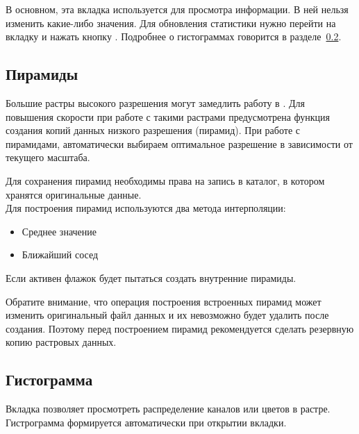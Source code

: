 В основном, эта вкладка используется для просмотра информации. В ней
нельзя изменить какие-либо значения. Для обновления статистики нужно
перейти на вкладку  и нажать кнопку .
Подробнее о гистограммах говорится в разделе~\ref{label_histogram}.

\subsection{Пирамиды}\label{raster_pyramids}

Большие растры высокого разрешения могут замедлить работу в \qg. Для повышения
скорости при работе с такими растрами предусмотрена функция создания
копий данных низкого разрешения (пирамид). При работе с пирамидами, \qg
автоматически выбираем оптимальное разрешение в зависимости от текущего масштаба.

Для сохранения пирамид необходимы права на запись в каталог, в котором
хранятся оригинальные данные. \\
Для построения пирамид используются два метода интерполяции:
\begin{itemize}[label=--]
\item Среднее значение
\item Ближайший сосед
\end{itemize}

Если активен флажок
 \qg будет
пытаться создать внутренние пирамиды.

Обратите внимание, что операция построения встроенных пирамид может
изменить оригинальный файл данных и их невозможно будет удалить после
создания. Поэтому перед построением пирамид рекомендуется сделать резервную копию
растровых данных.

\subsection{Гистограмма}\label{label_histogram}

Вкладка  позволяет просмотреть распределение 
каналов или цветов в растре. Гистрограмма формируется автоматически при
открытии вкладки.

%
%

